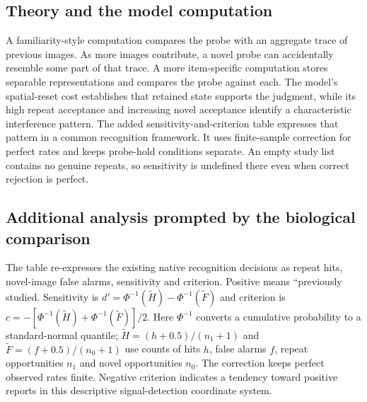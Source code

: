 \documentclass[11pt]{article}
\begin{document}
\subsection{Theory and the model computation}
A familiarity-style computation compares the probe with an aggregate trace of previous images. As more images contribute, a novel probe can accidentally resemble some part of that trace. A more item-specific computation stores separable representations and compares the probe against each. The model’s spatial-reset cost establishes that retained state supports the judgment, while its high repeat acceptance and increasing novel acceptance identify a characteristic interference pattern. The added sensitivity-and-criterion table expresses that pattern in a common recognition framework. It uses finite-sample correction for perfect rates and keeps probe-hold conditions separate. An empty study list contains no genuine repeats, so sensitivity is undefined there even when correct rejection is perfect.

\subsection{Additional analysis prompted by the biological comparison}
The table re-expresses the existing native recognition decisions as repeat hits, novel-image false alarms, sensitivity and criterion. Positive means ``previously studied. Sensitivity is $d'=\Phi^{-1}(\widetilde H)-\Phi^{-1}(\widetilde F)$ and criterion is $c=-[\Phi^{-1}(\widetilde H)+\Phi^{-1}(\widetilde F)]/2$. Here $\Phi^{-1}$ converts a cumulative probability to a standard-normal quantile; $\widetilde H=(h+0.5)/(n_1+1)$ and $\widetilde F=(f+0.5)/(n_0+1)$ use counts of hits $h$, false alarms $f$, repeat opportunities $n_1$ and novel opportunities $n_0$. The correction keeps perfect observed rates finite. Negative criterion indicates a tendency toward positive reports in this descriptive signal-detection coordinate system.
\end{document}

